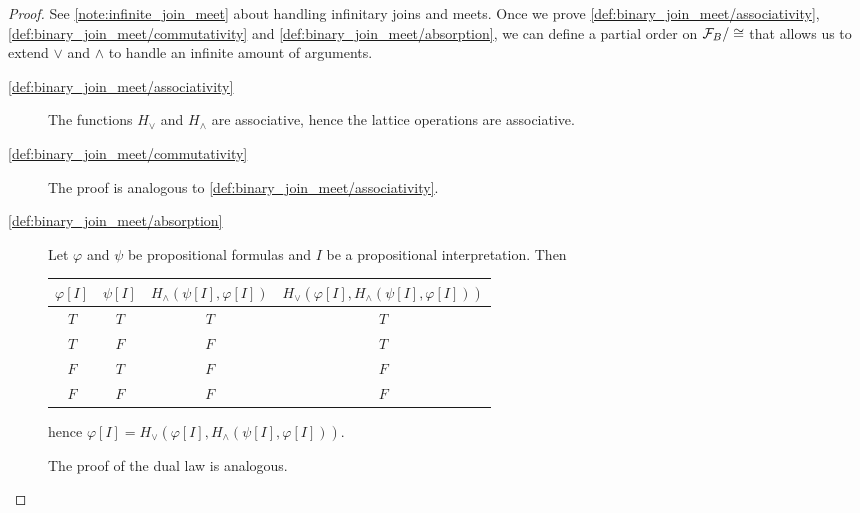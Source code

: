 \begin{proof}
  See \cref{note:infinite_join_meet} about handling infinitary joins and meets. Once we prove \ref{def:binary_join_meet/associativity}, \ref{def:binary_join_meet/commutativity} and \ref{def:binary_join_meet/absorption}, we can define a partial order on $\mathcal F_B / \cong$ that allows us to extend $\lor$ and $\land$ to handle an infinite amount of arguments.

  \begin{description}
    \item[\ref{def:binary_join_meet/associativity}] The functions $H_\lor$ and $H_\land$ are associative, hence the lattice operations are associative.
    \item[\ref{def:binary_join_meet/commutativity}] The proof is analogous to \ref{def:binary_join_meet/associativity}.
    \item[\ref{def:binary_join_meet/absorption}] Let $\varphi$ and $\psi$ be propositional formulas and $I$ be a propositional interpretation. Then
    \begin{center}
      \begin{tabular}{c c | c | c}
        $\varphi[I]$ & $\psi[I]$ & $H_\land(\psi[I], \varphi[I])$ & $H_\lor(\varphi[I], H_\land(\psi[I], \varphi[I]))$ \\
        \hline
        $T$          & $T$       & $T$                            & $T$    \\
        $T$          & $F$       & $F$                            & $T$    \\
        $F$          & $T$       & $F$                            & $F$    \\
        $F$          & $F$       & $F$                            & $F$
      \end{tabular}
    \end{center}
    hence $\varphi[I] = H_\lor(\varphi[I], H_\land(\psi[I], \varphi[I]))$.

    The proof of the dual law is analogous.


\end{description}
\end{proof}
